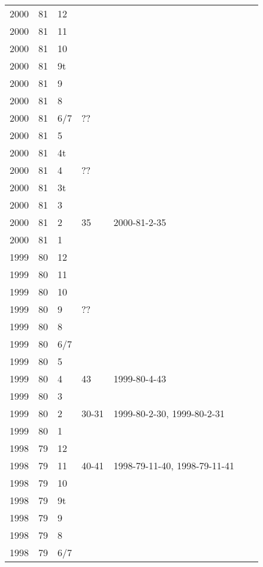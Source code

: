 \begin{longtable}{ |l|l|l|l|p{2.7cm}|l|p{2cm}| }
 2000 & 81 &    12 &         &  &  & \\
 2000 & 81 &    11 &         &  &  & \\
 2000 & 81 &    10 &         &  &  & \\
 2000 & 81 &    9t &         &  &  & \\
 2000 & 81 &     9 &         &  &  & \\
 2000 & 81 &     8 &         &  &  & \\
 2000 & 81 &   6/7 &     ??  &  &  & \\
 2000 & 81 &     5 &         &  &  & \\
 2000 & 81 &    4t &         &  &  & \\
 2000 & 81 &     4 &     ??  &  &  & \\
 2000 & 81 &    3t &         &  &  & \\
 2000 & 81 &     3 &         &  &  & \\
 2000 & 81 &     2 &   35    & 2000-81-2-35   &  & \\
 2000 & 81 &     1 &         &  &  & \\
 1999 & 80 &    12 &         &  &  & \\
 1999 & 80 &    11 &         &  &  & \\
 1999 & 80 &    10 &         &  &  & \\
 1999 & 80 &     9 &     ??  &  &  & \\
 1999 & 80 &     8 &         &  &  & \\
 1999 & 80 &   6/7 &         &  &  & \\
 1999 & 80 &     5 &         &  &  & \\
 1999 & 80 &     4 &   43    & 1999-80-4-43  &  & \\
 1999 & 80 &     3 &         &  &  & \\
 1999 & 80 &     2 &   30-31 & 1999-80-2-30, 1999-80-2-31 &  & \\
 1999 & 80 &     1 &         &  &  & \\
 1998 & 79 &    12 &         &  &  & \\
 1998 & 79 &    11 &  40-41  & 1998-79-11-40, 1998-79-11-41  &  & \\
 1998 & 79 &    10 &         &  &  & \\
 1998 & 79 &    9t &         &  &  & \\
 1998 & 79 &     9 &         &  &  & \\
 1998 & 79 &     8 &         &  &  & \\
 1998 & 79 &   6/7 &         &  &  & \\

\end{longtable}
